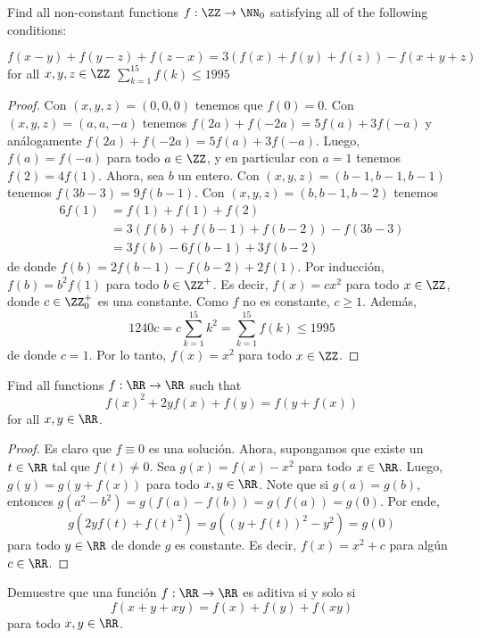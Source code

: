 \begin{probEG}
	Find all non-constant functions $f:\ZZ\to\NN_0$ satisfying all of the following conditions:
	\begin{enumerate}[(i)]
		\ii $f(x-y)+f(y-z)+f(z-x)=3(f(x)+f(y)+f(z))-f(x+y+z)$ for all $x,y,z\in\ZZ$
		\ii $\sum_{k=1}^{15}f(k)\le 1995$
	\end{enumerate}
\end{probEG}

\begin{proof}
	Con $(x,y,z)=(0,0,0)$ tenemos que $f(0)=0$. Con $(x,y,z)=(a,a,-a)$ tenemos $f(2a)+f(-2a)=5f(a)+3f(-a)$ y análogamente $f(2a)+f(-2a)=5f(a)+3f(-a)$. Luego, $f(a)=f(-a)$ para todo $a\in\ZZ$, y en particular con $a=1$ tenemos $f(2)=4f(1)$. Ahora, sea $b$ un entero. Con $(x,y,z)=(b-1,b-1,b-1)$ tenemos $f(3b-3)=9f(b-1)$. Con $(x,y,z)=(b,b-1,b-2)$ tenemos
	\begin{align*}
		6f(1)
		&=f(1)+f(1)+f(2)\\
		&=3(f(b)+f(b-1)+f(b-2))-f(3b-3)\\
		&=3f(b)-6f(b-1)+3f(b-2)
	\end{align*}
	de donde $f(b)=2f(b-1)-f(b-2)+2f(1)$. Por inducción, $f(b)=b^2f(1)$ para todo $b\in\ZZ^+$. Es decir, $f(x)=cx^2$ para todo $x\in\ZZ$, donde $c\in\ZZ^+_0$ es una constante. Como $f$ no es constante, $c\ge 1$. Además,
	\[1240c=c\sum_{k=1}^{15}k^2=\sum_{k=1}^{15}f(k)\le 1995\]
	de donde $c=1$. Por lo tanto, $f(x)=x^2$ para todo $x\in\ZZ$.
\end{proof}

\begin{probMG}
	Find all functions $f:\RR\to\RR$ such that
	\[f(x)^2+2yf(x)+f(y)=f(y+f(x))\]
	for all $x,y\in\RR$.
\end{probMG}

\begin{proof}
	Es claro que $f\equiv 0$ es una solución. Ahora, supongamos que existe un $t\in\RR$ tal que $f(t)\ne 0$.
	Sea $g(x)=f(x)-x^2$ para todo $x\in\RR$. Luego, $g(y)=g(y+f(x))$ para todo $x,y\in\RR$. Note que si $g(a)=g(b)$, entonces $g(a^2-b^2)=g(f(a)-f(b))=g(f(a))=g(0)$. Por ende,
	\[g(2yf(t)+f(t)^2)=g((y+f(t))^2-y^2)=g(0)\]
	para todo $y\in\RR$ de donde $g$ es constante. Es decir, $f(x)=x^2+c$ para algún $c\in\RR$.
\end{proof}

\begin{probEG}
	Demuestre que una función $f:\RR\to\RR$ es aditiva si y solo si
	\[f(x+y+xy)=f(x)+f(y)+f(xy)\]
	para todo $x,y\in\RR$.
\end{probEG}

